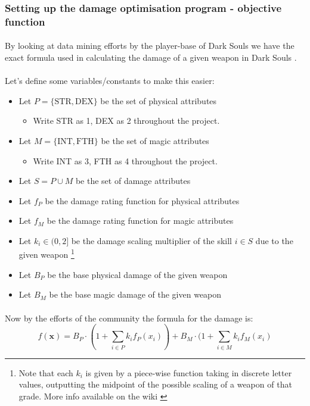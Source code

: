 \documentclass{article}
\begin{document}
\subsubsection{Setting up the damage optimisation program - objective function}
\paragraph{}By looking at data mining efforts by the player-base of Dark Souls we have the exact formula used in calculating the damage of a given weapon in Dark Souls \cite{dswiki-formula}.
\paragraph{}Let's define some variables/constants to make this easier:
\begin{itemize}
\item Let $P = \{\text{STR},\text{DEX}\}$ be the set of physical attributes
\begin{itemize}
\item Write STR as 1, DEX as 2 throughout the project.
\end{itemize}
\item Let $M = \{\text{INT},\text{FTH}\}$ be the set of magic attributes
\begin{itemize}
\item Write INT as 3, FTH as 4 throughout the project.
\end{itemize}
\item Let $S = P \cup M$ be the set of damage attributes
\item Let $f_P$ be the damage rating function for physical attributes
\item Let $f_M$ be the damage rating function for magic attributes
\item Let $k_i \in (0,2]$ be the damage scaling multiplier of the skill $i \in S$ due to the given weapon \footnote{Note that each $k_i$ is given by a piece-wise function taking in discrete letter values, outputting the midpoint of the possible scaling of a weapon of that grade. More info available on the wiki \cite{dswiki-formula} \cite{dswiki-formula-2}}
\item Let $B_P$ be the base physical damage of the given weapon
\item Let $B_M$ be the base magic damage of the given weapon
\end{itemize}

\paragraph{}Now by the efforts of the community \cite{dswiki-formula} the formula for the damage is:
\begin{equation}
f(\boldsymbol{x}) = B_P\cdot (1 + \sum_{i \in P} k_i f_P(x_i)) + B_M \cdot (1 + \sum_{i \in M} k_i f_M(x_i)
\end{equation}
\end{document}
